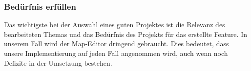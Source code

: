 \subsubsection{Bedürfnis erfüllen}
Das wichtigste bei der Auswahl eines guten Projektes ist die Relevanz des
bearbeiteten Themas und das Bedürfnis des Projekts für das erstellte Feature.
In unserem Fall wird der Map-Editor dringend gebraucht. Dies bedeutet, dass
unsere Implementierung auf jeden Fall angenommen wird, auch wenn noch Defizite
in der Umsetzung bestehen.

